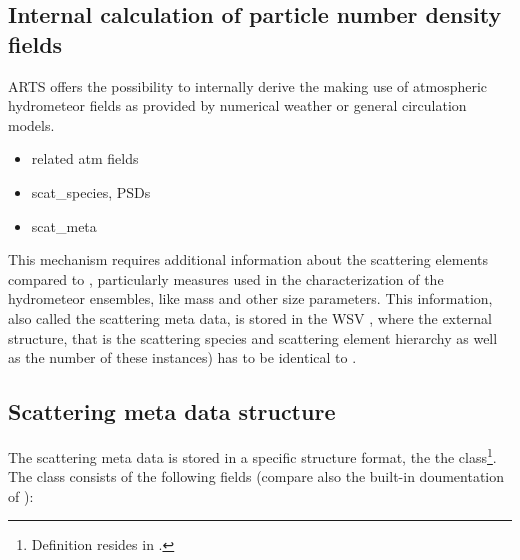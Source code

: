 \subsection{Internal calculation of particle number density fields}
\label{sec:clouds:pndgen:internal}

ARTS offers the possibility to internally derive the 
making use of atmospheric hydrometeor fields as provided by numerical weather or
general circulation models.

\begin{itemize}
\item related atm fields
\item scat\_species, PSDs
\item scat\_meta
\end{itemize}

This mechanism requires additional information about the scattering elements
compared to , particularly measures used in the
characterization of the hydrometeor ensembles, like mass and other size
parameters. This information, also called the scattering meta data, is stored in
the WSV , where the external structure, that is the
scattering species and scattering element hierarchy as well as the number of
these instances) has to be identical to .

\subsection{Scattering meta data structure}
\label{sec:clouds:ARTS_SMD_structure}
The scattering meta data is stored in a specific structure format, the
the  class\footnote{Definition resides in
.}. The class consists of the following fields
(compare also %
 the built-in doumentation of ):

